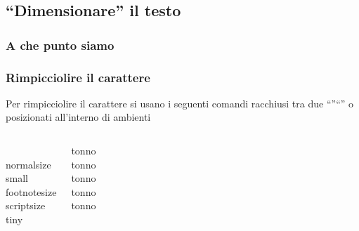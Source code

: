 \documentclass[svgnames,%
	ucs,%
	pdftex]{guitbeamer}
\begin{document}
\subsection{``Dimensionare'' il testo}
\begin{frame}
  \frametitle{A che punto siamo}
\end{frame}
\begin{frame}
  \frametitle{Rimpicciolire il carattere}
	Per rimpicciolire il carattere si usano i seguenti comandi racchiusi tra due ``\LCmd[]{\{}''\;``\LCmd[]{\}}'' o posizionati all'interno di ambienti
	\begin{columns}
		\begin{LaTeXcode}
			\\normalsize \n
			\\small \n
			\\footnotesize \n
			\\scriptsize \n
			\\tiny 
		\end{LaTeXcode}
		\begin{LaTeXoutput}[]
			tonno\\[.5ex]
			\small tonno \\[1ex]
			\footnotesize tonno\\[1.5ex]
			\scriptsize tonno\\[2ex]
			\tiny tonno
		\end{LaTeXoutput}
	\end{columns}
\end{frame}
\end{document}
